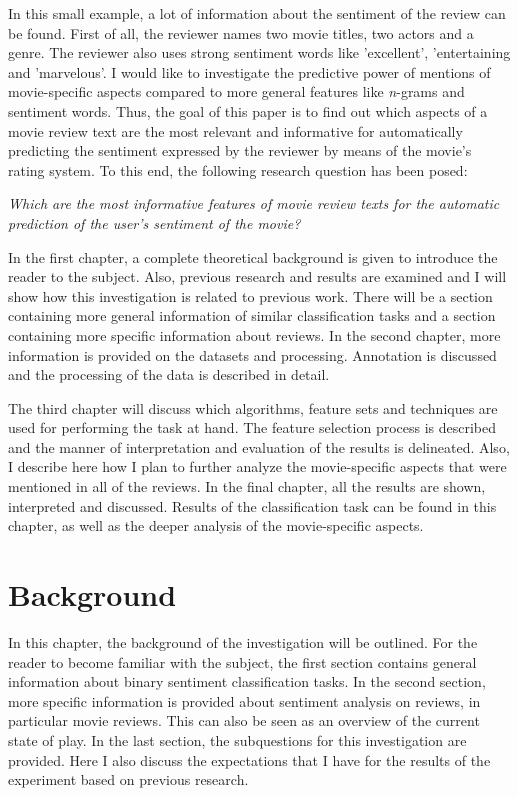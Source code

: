 \documentclass[
10pt, %
a4paper, %
oneside, %
headinclude,footinclude, %
] {book}%
\begin{document}
In this small example, a lot of information about the sentiment of the review can be found. First of all, the reviewer names two movie titles, two actors and a genre. The reviewer also uses strong sentiment words like 'excellent', 'entertaining and 'marvelous'. I would like to investigate the predictive power of mentions of movie-specific aspects compared to more general features like \textit n-grams and sentiment words. Thus, the goal of this paper is to find out which aspects of a movie review text are the most relevant and informative for automatically predicting the sentiment expressed by the reviewer by means of the movie's rating system. To this end, the following research question has been posed:

\begin{center}
\textit{Which are the most informative features of movie review texts for the automatic prediction of the user's sentiment of the movie?}
\end{center}

In the first chapter, a complete theoretical background is given to introduce the reader to the subject. Also, previous research and results are examined and I will show how this investigation is related to previous work. There will be a section containing more general information of similar classification tasks and a section containing more specific information about reviews. In the second chapter, more information is provided on the datasets and processing. Annotation is discussed and the processing of the data is described in detail.

The third chapter will discuss which algorithms, feature sets and techniques are used for performing the task at hand. The feature selection process is described and the manner of interpretation and evaluation of the results is delineated. Also, I describe here how I plan to further analyze the movie-specific aspects that were mentioned in all of the reviews. In the final chapter, all the results are shown, interpreted and discussed. Results of the classification task can be found in this chapter, as well as the deeper analysis of the movie-specific aspects.


\chapter{Background}

In this chapter, the background of the investigation will be outlined. For the reader to become familiar with the subject, the first section contains general information about binary sentiment classification tasks. In the second section, more specific information is provided about sentiment analysis on reviews, in particular movie reviews. This can also be seen as an overview of the current state of play. In the last section, the subquestions for this investigation are provided. Here I also discuss the expectations that I have for the results of the experiment based on previous research.
\end{document}
